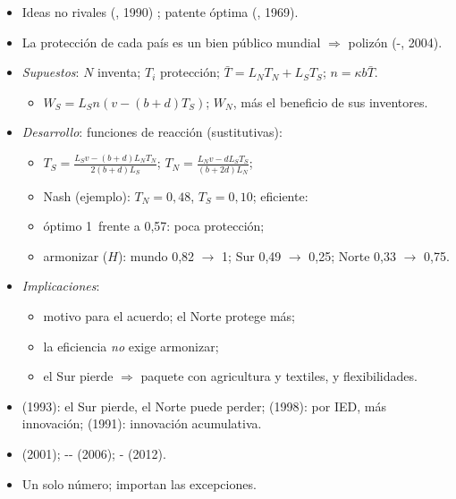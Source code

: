 \documentclass{article}
\begin{document}
\begin{columnas}
\begin{itemize}
\item Ideas no rivales (, 1990) ; patente óptima (, 1969).
\item La protección de cada país es un bien público mundial $\Rightarrow$ polizón (-, 2004).
\end{itemize}
\begin{itemize}
\item \emph{Supuestos}: $N$ inventa; $T_i$ protección; $\bar T=L_NT_N+L_ST_S$; $n=\kappa b\bar T$.
  \begin{itemize}
  \item $W_S=L_Sn(v-(b+d)T_S)$; $W_N$, más el beneficio de sus inventores.
  \end{itemize}
\item \emph{Desarrollo}: funciones de reacción (sustitutivas):
  \begin{itemize}
  \item $T_S=\frac{L_Sv-(b+d)L_NT_N}{2(b+d)L_S}$; $T_N=\frac{L_Nv-dL_ST_S}{(b+2d)L_N}$;
  \item Nash (ejemplo): $T_N=0{,}48$, $T_S=0{,}10$; eficiente:
  \item óptimo 1~frente a 0,57: poca protección;
  \item armonizar ($H$): mundo 0,82 $\to$ 1; Sur 0,49 $\to$ 0,25; Norte 0,33 $\to$ 0,75.
  \end{itemize}
\end{itemize}
\begin{itemize}
\item \emph{Implicaciones}:
  \begin{itemize}
  \item motivo para el acuerdo; el Norte protege más;
  \item la eficiencia \emph{no} exige armonizar;
  \item el Sur pierde $\Rightarrow$ paquete con agricultura y textiles, y flexibilidades.
  \end{itemize}
\end{itemize}
\begin{itemize}
\item {} (1993): el Sur pierde, el Norte puede perder;  (1998): por IED, más innovación;  (1991): innovación acumulativa.
\item {} (2001); -- (2006); - (2012).
\item Un solo número; importan las excepciones.
\end{itemize}


\end{columnas}
\end{document}
